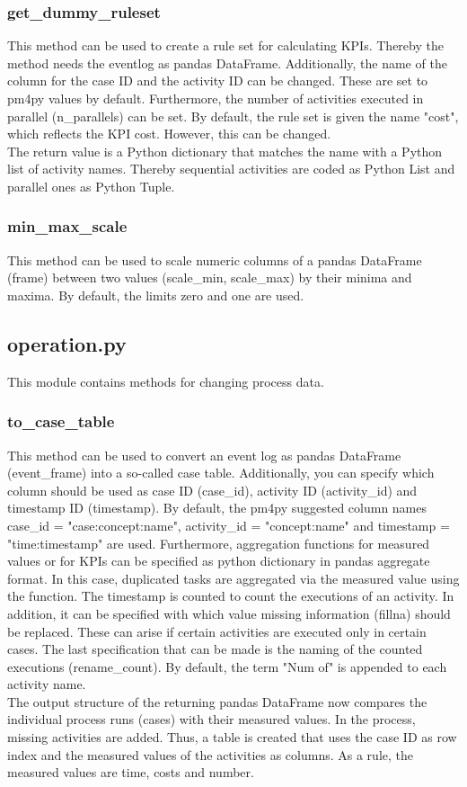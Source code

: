     \subsubsection*{get\_dummy\_ruleset}
    This method can be used to create a rule set for calculating KPIs. Thereby the method needs the eventlog as pandas DataFrame. Additionally, the name of the column for the case ID and the activity ID can be changed. These are set to pm4py values by default. Furthermore, the number of activities executed in parallel (n\_parallels) can be set. By default, the rule set is given the name "cost", which reflects the KPI cost. However, this can be changed.\\
    The return value is a Python dictionary that matches the name with a Python list of activity names. Thereby sequential activities are coded as Python List and parallel ones as Python Tuple.\label{dummyrs}
    \subsubsection*{min\_max\_scale}
    This method can be used to scale numeric columns of a pandas DataFrame (frame) between two values (scale\_min, scale\_max) by their minima and maxima. By default, the limits zero and one are used.\label{minmax}

    \subsection{operation.py}
    This module contains methods for changing process data.
    \subsubsection*{to\_case\_table}
    This method can be used to convert an event log as pandas DataFrame (event\_frame) into a so-called case table. Additionally, you can specify which column should be used as case ID (case\_id), activity ID (activity\_id) and timestamp ID (timestamp). By default, the pm4py suggested column names case\_id = "case:concept:name", activity\_id = "concept:name" and timestamp = "time:timestamp" are used. Furthermore, aggregation functions for measured values or for KPIs can be specified as python dictionary in pandas aggregate format. In this case, duplicated tasks are aggregated via the measured value using the function. The timestamp is counted to count the executions of an activity. In addition, it can be specified with which value missing information (fillna) should be replaced. These can arise if certain activities are executed only in certain cases. The last specification that can be made is the naming of the counted executions (rename\_count). By default, the term "Num of" is appended to each activity name.\\
    The output structure of the returning pandas DataFrame now compares the individual process runs (cases) with their measured values. In the process, missing activities are added. Thus, a table is created that uses the case ID as row index and the measured values of the activities as columns. As a rule, the measured values are time, costs and number.\label{tocasetable}
